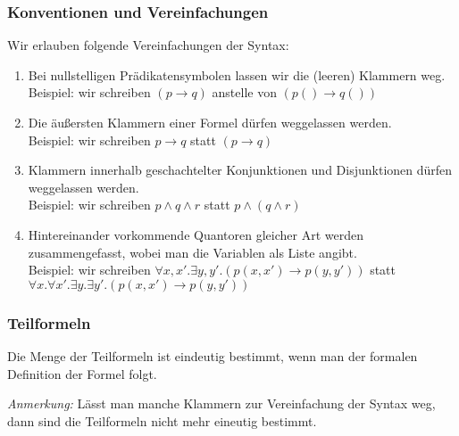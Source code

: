 \documentclass[onlymath]{beamer}
\begin{document}
\begin{frame}\frametitle{Konventionen und Vereinfachungen}

Wir erlauben folgende \alert{Vereinfachungen der Syntax:}\pause
\begin{enumerate}[(1)]
\item Bei nullstelligen Prädikatensymbolen lassen wir die (leeren) Klammern weg.\\
Beispiel: wir schreiben $(p\to q)$ anstelle von $(p()\to q())$\pause
%
\item Die äußersten Klammern einer Formel dürfen weggelassen werden.\\
Beispiel: wir schreiben $p\to q$ statt $(p\to q)$\pause
%
\item Klammern innerhalb geschachtelter Konjunktionen und Disjunktionen dürfen
weggelassen werden.\\
Beispiel: wir schreiben $p\wedge q\wedge r$ statt $p\wedge (q\wedge r)$\pause
%
\item Hintereinander vorkommende Quantoren gleicher Art werden zusammengefasst, wobei man die Variablen als Liste angibt.\\
Beispiel: wir schreiben $\forall x,x'.\exists y,y'.(p(x,x')\to p(y,y'))$ statt $\forall x.\forall x'.\exists y.\exists y'.(p(x,x')\to p(y,y'))$\pause
\end{enumerate}


\end{frame}


\begin{frame}\frametitle{Teilformeln}


Die Menge der Teilformeln ist eindeutig bestimmt, wenn man der formalen 
Definition der Formel folgt.


\pause\emph{Anmerkung:} Lässt man manche Klammern zur Vereinfachung der Syntax weg, dann 
sind die Teilformeln nicht mehr eineutig bestimmt.


\end{frame}
\end{document}
